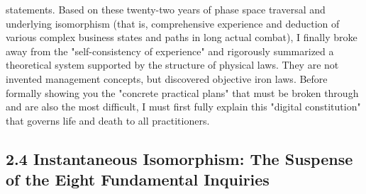 \documentclass[11pt,a4paper]{article}
\begin{document}
statements. Based on these twenty-two years of phase space traversal and underlying isomorphism (that is, comprehensive experience and deduction of various complex business states and paths in long actual combat), I finally broke away from the "self-consistency of experience" and rigorously summarized a theoretical system supported by the structure of physical laws. They are not invented management concepts, but discovered objective iron laws. Before formally showing you the "concrete practical plans" that must be broken through and are also the most difficult, I must first fully explain this "digital constitution" that governs life and death to all practitioners.


\subsection*{2.4 Instantaneous Isomorphism: The Suspense of the Eight Fundamental Inquiries}
\end{document}
